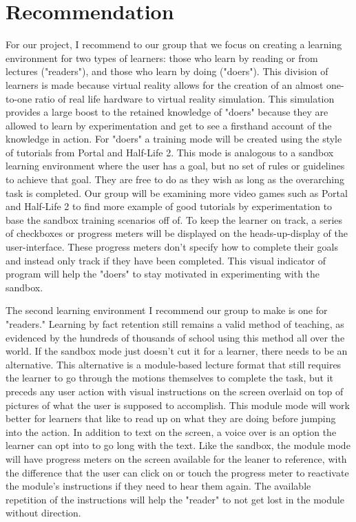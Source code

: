 \documentclass[onecolumn, draftclsnofoot,10pt, compsoc]{IEEEtran}
\begin{document}
\section{Recommendation}
For our project, I recommend to our group that we focus on creating a learning environment for two types of learners: those who learn by reading or from lectures ("readers"), and those who learn by doing ("doers"). This division of learners is made because virtual reality allows for the creation of an almost one-to-one ratio of real life hardware to virtual reality simulation. This simulation provides a large boost to the retained knowledge of "doers" because they are allowed to learn by experimentation and get to see a firsthand account of the knowledge in action. For "doers" a training mode will be created using the style of tutorials from Portal and Half-Life 2. This mode is analogous to a sandbox learning environment where the user has a goal, but no set of rules or guidelines to achieve that goal. They are free to do as they wish as long as the overarching task is completed. Our group will be examining more video games such as Portal and Half-Life 2 to find more example of good tutorials by experimentation to base the sandbox training scenarios off of. To keep the learner on track, a series of checkboxes or progress meters will be displayed on the heads-up-display of the user-interface. These progress meters don't specify how to complete their goals and instead only track if they have been completed. This visual indicator of program will help the "doers" to stay motivated in experimenting with the sandbox.

The second learning environment I recommend our group to make is one for "readers." Learning by fact retention still remains a valid method of teaching, as evidenced by the hundreds of thousands of school using this method all over the world. If the sandbox mode just doesn't cut it for a learner, there needs to be an alternative. This alternative is a module-based lecture format that still requires the learner to go through the motions themselves to complete the task, but it preceds any user action with visual instructions on the screen overlaid on top of pictures of what the user is supposed to accomplish. This module mode will work better for learners that like to read up on what they are doing before jumping into the action. In addition to text on the screen, a voice over is an option the learner can opt into to go long with the text. Like the sandbox, the module mode will have progress meters on the screen available for the leaner to reference, with the difference that the user can click on or touch the progress meter to reactivate the module's instructions if they need to hear them again. The available repetition of the instructions will help the "reader" to not get lost in the module without direction.
\end{document}
